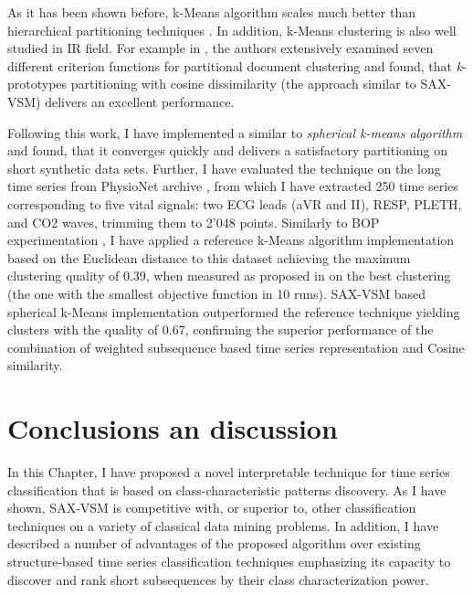As it has been shown before, k-Means algorithm scales much better than hierarchical partitioning techniques 
\cite{citeulike:4195343}. In addition, k-Means clustering is also well studied in IR field. 
For example in \cite{citeulike:505248}, the authors extensively examined seven different criterion functions for 
partitional document clustering and found, that \textit{k}-prototypes partitioning with cosine dissimilarity 
(the approach similar to \mbox{SAX-VSM}) delivers an excellent performance. 

Following this work, I have implemented a similar to \cite{citeulike:1172599} \textit{spherical k-means algorithm}
and found, that it converges quickly and delivers a satisfactory partitioning on short synthetic data sets. 
Further, I have evaluated the technique on the long time series from PhysioNet archive \cite{citeulike:699487}, 
from which I have extracted 250 time series corresponding to five vital signals: 
two ECG leads (aVR and II), RESP, PLETH, and CO2 waves, trimming them to 2'048 points. 
Similarly to BOP experimentation \cite{citeulike:10525778}, I have applied a reference k-Means algorithm 
implementation based on the Euclidean distance \cite{R_software} \cite{hartigan1979} to this dataset achieving 
the maximum clustering quality of 0.39, when measured as proposed in \cite{citeulike:1325189} on the best clustering 
(the one with the smallest objective function in 10 runs). 
SAX-VSM based spherical k-Means implementation outperformed the reference technique yielding 
clusters  with the quality of 0.67, confirming the superior performance of the combination of weighted subsequence 
based time series representation and Cosine similarity.

\section{Conclusions an discussion} \label{conclusion}
In this Chapter, I have proposed a novel interpretable technique for time series classification that 
is based on class-characteristic patterns discovery. As I have shown, SAX-VSM is competitive with, or 
superior to, other classification techniques on a variety of classical data mining problems. 
In addition, I have described a number of advantages of the proposed algorithm over existing structure-based 
time series classification techniques emphasizing its capacity to discover and rank 
short subsequences by their class characterization power. 

